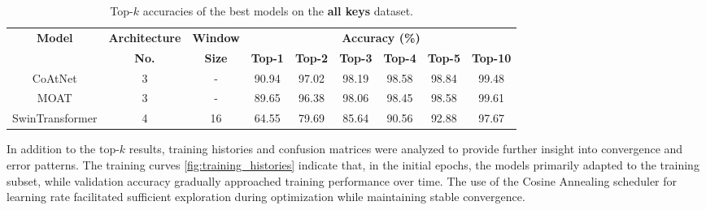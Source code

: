 \documentclass[a4paper,11pt,twoside]{report}
\theoremstyle{definition}
\begin{document}
\begin{table}[h!]
\centering
\caption{Top-$k$ accuracies of the best models on the \textbf{all keys} dataset.}
\begin{adjustbox}{max width=\textwidth}
\begin{tabular}{c|c|c|cccccc}
\hline
\textbf{Model} & \textbf{Architecture} & \textbf{Window} & \multicolumn{6}{c}{\textbf{Accuracy (\%)}} \\
\cline{4-9}
 & \textbf{No.} & \textbf{Size} & \textbf{Top-1} & \textbf{Top-2} & \textbf{Top-3} & \textbf{Top-4} & \textbf{Top-5} & \textbf{Top-10} \\
\hline
CoAtNet & 3 & - & 90.94 & 97.02 & 98.19 & 98.58 & 98.84 & 99.48 \\
MOAT & 3 & - & 89.65 & 96.38 & 98.06 & 98.45 & 98.58 & 99.61 \\
SwinTransformer & 4 & 16 & 64.55 & 79.69 & 85.64 & 90.56 & 92.88 & 97.67 \\
\hline
\end{tabular}
\end{adjustbox}
\label{tab:all_keys_top_k_accuracies}
\end{table}

In addition to the top-$k$ results, training histories and confusion matrices were analyzed to provide further insight into convergence and error patterns. The training curves \ref{fig:training_histories} indicate that, in the initial epochs, the models primarily adapted to the training subset, while validation accuracy gradually approached training performance over time. The use of the Cosine Annealing scheduler for learning rate facilitated sufficient exploration during optimization while maintaining stable convergence.
\end{document}
